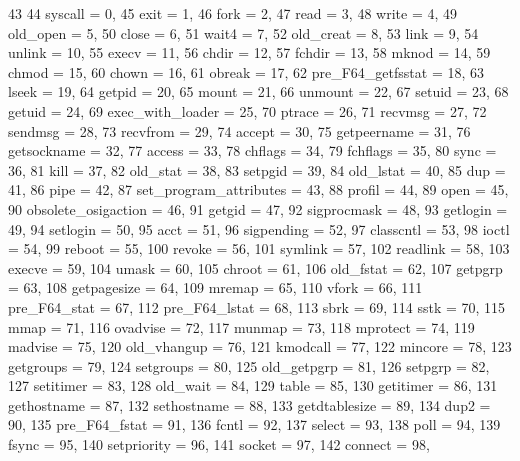 \begin{DoxyCode}
43          {
44         syscall = 0,
45         exit = 1,
46         fork = 2,
47         read = 3,
48         write = 4,
49         old_open = 5,
50         close = 6,
51         wait4 = 7,
52         old_creat = 8,
53         link = 9,
54         unlink = 10,
55         execv = 11,
56         chdir = 12,
57         fchdir = 13,
58         mknod = 14,
59         chmod = 15,
60         chown = 16,
61         obreak = 17,
62         pre_F64_getfsstat = 18,
63         lseek = 19,
64         getpid = 20,
65         mount = 21,
66         unmount = 22,
67         setuid = 23,
68         getuid = 24,
69         exec_with_loader = 25,
70         ptrace = 26,
71         recvmsg = 27,
72         sendmsg = 28,
73         recvfrom = 29,
74         accept = 30,
75         getpeername = 31,
76         getsockname = 32,
77         access = 33,
78         chflags = 34,
79         fchflags = 35,
80         sync = 36,
81         kill = 37,
82         old_stat = 38,
83         setpgid = 39,
84         old_lstat = 40,
85         dup = 41,
86         pipe = 42,
87         set_program_attributes = 43,
88         profil = 44,
89         open = 45,
90         obsolete_osigaction = 46,
91         getgid = 47,
92         sigprocmask = 48,
93         getlogin = 49,
94         setlogin = 50,
95         acct = 51,
96         sigpending = 52,
97         classcntl = 53,
98         ioctl = 54,
99         reboot = 55,
100         revoke = 56,
101         symlink = 57,
102         readlink = 58,
103         execve = 59,
104         umask = 60,
105         chroot = 61,
106         old_fstat = 62,
107         getpgrp = 63,
108         getpagesize = 64,
109         mremap = 65,
110         vfork = 66,
111         pre_F64_stat = 67,
112         pre_F64_lstat = 68,
113         sbrk = 69,
114         sstk = 70,
115         mmap = 71,
116         ovadvise = 72,
117         munmap = 73,
118         mprotect = 74,
119         madvise = 75,
120         old_vhangup = 76,
121         kmodcall = 77,
122         mincore = 78,
123         getgroups = 79,
124         setgroups = 80,
125         old_getpgrp = 81,
126         setpgrp = 82,
127         setitimer = 83,
128         old_wait = 84,
129         table = 85,
130         getitimer = 86,
131         gethostname = 87,
132         sethostname = 88,
133         getdtablesize = 89,
134         dup2 = 90,
135         pre_F64_fstat = 91,
136         fcntl = 92,
137         select = 93,
138         poll = 94,
139         fsync = 95,
140         setpriority = 96,
141         socket = 97,
142         connect = 98,
}
\end{DoxyCode}
